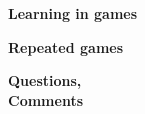 
\begin{framestruct}
  \Large
  \textbf{Learning in games}
  \bigskip
  \pause

  \textbf{Repeated games}
\end{framestruct}

\begin{framestruct}
  \textbf{\Huge Questions, \\ \bigskip Comments}
\end{framestruct}